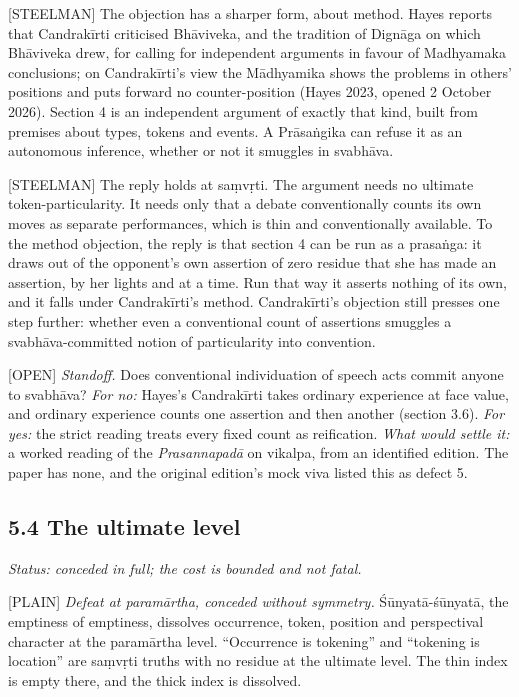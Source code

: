 \documentclass[11pt]{article}
\newcommand{\register}[1]{{\ttfamily\small #1}}
\begin{document}
\register{[STEELMAN]} The objection has a sharper form, about method. Hayes reports that Candrakīrti criticised Bhāviveka, and the tradition of Dignāga on which Bhāviveka drew, for calling for independent arguments in favour of Madhyamaka conclusions; on Candrakīrti's view the Mādhyamika shows the problems in others' positions and puts forward no counter-position (Hayes 2023, opened 2 October 2026). Section 4 is an independent argument of exactly that kind, built from premises about types, tokens and events. A Prāsaṅgika can refuse it as an autonomous inference, whether or not it smuggles in svabhāva.

\register{[STEELMAN]} The reply holds at saṃvṛti. The argument needs no ultimate token-particularity. It needs only that a debate conventionally counts its own moves as separate performances, which is thin and conventionally available. To the method objection, the reply is that section 4 can be run as a prasaṅga: it draws out of the opponent's own assertion of zero residue that she has made an assertion, by her lights and at a time. Run that way it asserts nothing of its own, and it falls under Candrakīrti's method. Candrakīrti's objection still presses one step further: whether even a conventional count of assertions smuggles a svabhāva-committed notion of particularity into convention.

\register{[OPEN]} \emph{Standoff.} Does conventional individuation of speech acts commit anyone to svabhāva? \emph{For no:} Hayes's Candrakīrti takes ordinary experience at face value, and ordinary experience counts one assertion and then another (section 3.6). \emph{For yes:} the strict reading treats every fixed count as reification. \emph{What would settle it:} a worked reading of the \emph{Prasannapadā} on vikalpa, from an identified edition. The paper has none, and the original edition's mock viva listed this as defect 5.

\subsection*{5.4 The ultimate level}

\emph{Status: conceded in full; the cost is bounded and not fatal.}

\register{[PLAIN]} \emph{Defeat at paramārtha, conceded without symmetry.} Śūnyatā-śūnyatā, the emptiness of emptiness, dissolves occurrence, token, position and perspectival character at the paramārtha level. ``Occurrence is tokening'' and ``tokening is location'' are saṃvṛti truths with no residue at the ultimate level. The thin index is empty there, and the thick index is dissolved.
\end{document}
